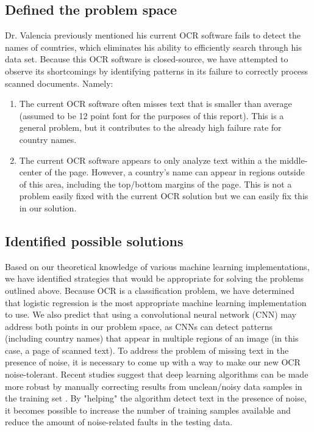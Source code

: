\documentclass{article}
\begin{document}
\subsection {Defined the problem space}
Dr. Valencia previously mentioned his current OCR software fails to detect the names of countries, which eliminates his ability to efficiently search through his data set. Because this OCR software is closed-source, we have attempted to observe its shortcomings by identifying patterns in its failure to correctly process scanned documents. Namely:
\begin{enumerate}
    \item The current OCR software often misses text that is smaller than average (assumed to be 12 point font for the purposes of this report). This is a general problem, but it contributes to the already high failure rate for country names.
    \item The current OCR software appears to only analyze text within a the middle-center of the page. However, a country's name can appear in regions outside of this area, including the top/bottom margins of the page.
    This is not a problem easily fixed with the current OCR solution but we can easily fix this in our solution.
\end{enumerate}{}

\subsection {Identified possible solutions}
Based on our theoretical knowledge of various machine learning implementations, we have identified strategies that would be appropriate for solving the problems outlined above. Because OCR is a classification problem, we have determined that logistic regression is the most appropriate machine learning implementation to use. We also predict that using a convolutional neural network (CNN) may address both points in our problem space, as CNNs can detect patterns (including country names) that appear in multiple regions of an image (in this case, a page of scanned text).
To address the problem of missing text in the presence of noise, it is necessary to come up with a way to make our new OCR noise-tolerant. Recent studies suggest that deep learning algorithms can be made more robust by manually correcting results from unclean/noisy data samples in the training set \cite{Song}. By "helping" the algorithm detect text in the presence of noise, it becomes possible to increase the number of training samples available and reduce the amount of noise-related faults in the testing data.
\end{document}
